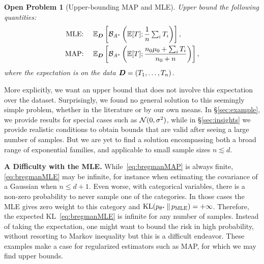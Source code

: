\documentclass[twoside]{article}
\newtheorem{problem}{Open Problem}
\newcommand*{\expect}[2][]{\ensuremath{\mathbb{E}_{#1} \left[ #2 \right] }} %
\newcommand{\logpart}{A}
\newcommand{\bregmanconj}{\cB_{\logpart^*}}
\newcommand{\nat}{\theta}
\newcommand{\m}{\mu}
\begin{document}
\begin{problem}[Upper-bounding MAP and MLE]
Upper bound the following quantities:
\begin{align}
	\label{eq:bregmanMLE}
	\text{MLE: } \quad &\expect[\mD]{\bregmanconj \left (\E [T] ;  \inv{n}  \smallsum_i T_i \right )}, \\
	\label{eq:bregmanMAP}
	\text{MAP: } \quad &\expect[\mD]{\bregmanconj \left (\E [T] ; \frac{n_0 \m_0 + \smallsum_i T_i}{n_0+n} \right )},
\end{align}
where the expectation is on the data ${\bm{D}} = (T_1, \dots, T_n)$.
\end{problem}

More explicitly, we want an upper bound that does not involve this expectation over the dataset.
Surprisingly, we found no general solution to this seemingly simple problem, whether in the literature or by our own means.
In \S\ref{sec:example}, we provide results for special cases such as ${\mathcal N}(0, \sigma^2)$,
while in \S\ref{sec:insights} we provide realistic conditions to obtain bounds that are valid after seeing a large number of samples.
But we are yet to find a solution encompassing both a broad range of exponential families,
and applicable to small sample sizes $n \lesssim d$.

{\bf A Difficulty with the MLE.}
While~\eqref{eq:bregmanMAP} is always finite, \eqref{eq:bregmanMLE} may be infinite,
for instance when estimating the covariance of a Gaussian when $n \leq d + 1$.
Even worse, with categorical variables, there is a non-zero probability to never sample one of the categories.
In those cases the MLE gives zero weight to this category and $\KL(p_{\nat^*} \,\Vert\, p_\text{MLE} ) = +\infty$.
Therefore, the expected KL~\eqref{eq:bregmanMLE} is infinite for any number of samples.
Instead of taking the expectation, one might want to bound the risk in high probability,
without resorting to Markov inequality but this is a difficult endeavor.
These examples make a case for regularized estimators such as MAP,
for which we may find upper bounds.
\end{document}
